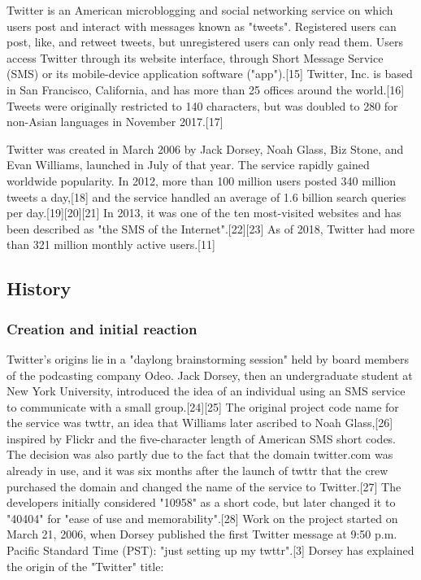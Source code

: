 \documentclass[12pt]{article}
\begin{document}
Twitter is an American microblogging and social networking service on which users post and interact with messages known as "tweets". Registered users can post, like, and retweet tweets, but unregistered users can only read them. Users access Twitter through its website interface, through Short Message Service (SMS) or its mobile-device application software ("app").[15] Twitter, Inc. is based in San Francisco, California, and has more than 25 offices around the world.[16] Tweets were originally restricted to 140 characters, but was doubled to 280 for non-Asian languages in November 2017.[17]

Twitter was created in March 2006 by Jack Dorsey, Noah Glass, Biz Stone, and Evan Williams, launched in July of that year. The service rapidly gained worldwide popularity. In 2012, more than 100 million users posted 340 million tweets a day,[18] and the service handled an average of 1.6 billion search queries per day.[19][20][21] In 2013, it was one of the ten most-visited websites and has been described as "the SMS of the Internet".[22][23] As of 2018, Twitter had more than 321 million monthly active users.[11] 







\subsection{History}


\subsubsection{Creation and initial reaction}


Twitter's origins lie in a "daylong brainstorming session" held by board members of the podcasting company Odeo. Jack Dorsey, then an undergraduate student at New York University, introduced the idea of an individual using an SMS service to communicate with a small group.[24][25] The original project code name for the service was twttr, an idea that Williams later ascribed to Noah Glass,[26] inspired by Flickr and the five-character length of American SMS short codes. The decision was also partly due to the fact that the domain twitter.com was already in use, and it was six months after the launch of twttr that the crew purchased the domain and changed the name of the service to Twitter.[27] The developers initially considered "10958" as a short code, but later changed it to "40404" for "ease of use and memorability".[28] Work on the project started on March 21, 2006, when Dorsey published the first Twitter message at 9:50 p.m. Pacific Standard Time (PST): "just setting up my twttr".[3] Dorsey has explained the origin of the "Twitter" title: 
\end{document}
